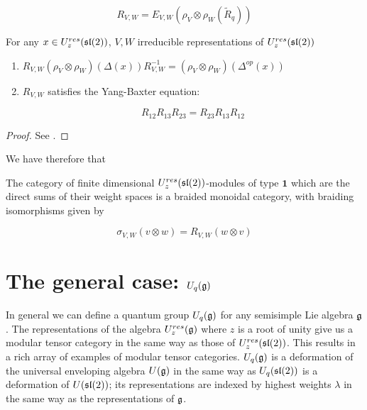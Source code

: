 \begin{equation}
R_{V,W} = E_{V,W} \left(\rho_V \otimes \rho_W (\tilde{R}_q)\right)
\end{equation}

\begin{claim}
For any $x \in U_z^{res}(\mathfrak{sl}(2))$, $V,W$ irreducible representations of $U_z^{res}(\mathfrak{sl}(2))$
\begin{enumerate}
\item $R_{V,W} (\rho_V \otimes \rho_W) (\Delta(x)) R^{-1}_{V,W} = (\rho_{V} \otimes \rho_W)(\Delta^{op}(x))$
\item $R_{V,W}$  satisfies the Yang-Baxter equation: 

\begin{equation}
R_{12} R_{13} R_{23} = R_{23} R_{13} R_{12}
\end{equation}
\end{enumerate}
\end{claim}
\begin{proof}
    See \cite{CP}.
\end{proof}

We have therefore that 

\begin{theorem}
\label{theorem:Braiding}
The category of finite dimensional $U_z^{res}(\mathfrak{sl}(2))$-modules of type
$\mathbf{1}$ which are the direct sums of their weight spaces is a braided
monoidal category, with braiding isomorphisms given by 

\begin{equation}
\sigma_{V,W}(v \otimes w) = R_{V,W}(w \otimes v)
\end{equation}
\end{theorem}


\section{The general case: $U_q(\mathfrak{g})$}
\label{section:U_q(g)}


In general we can define a quantum group $U_q(\mathfrak{g})$ for any semisimple Lie
algebra $\mathfrak{g}$. The representations of the algebra $U_z^{res}(\mathfrak{g})$
where $z$ is a root of unity give us a modular tensor category in the same way
as those of $U_z^{res}(\mathfrak{sl}(2))$. This results in a rich array of examples of
modular tensor categories. $U_q(\mathfrak{g})$ is a deformation of the
universal enveloping algebra $U(\mathfrak{g})$ in the same way as $U_q(\mathfrak{sl}(2))$ is a
deformation of $U(\mathfrak{sl}(2))$; its representations are indexed by highest weights
$\lambda$ in the same way as the representations of $\mathfrak{g}$. 

